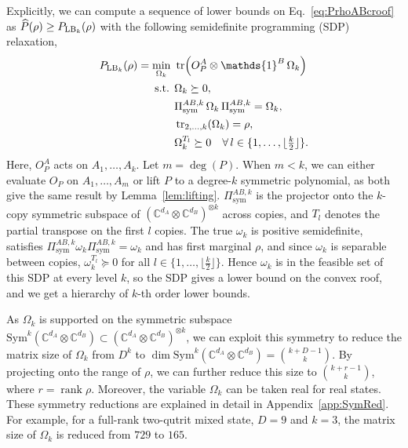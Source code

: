 \documentclass[11pt,a4paper]{report}
\newcommand{\one}{\mathds{1}}
\newcommand{\I}{\one}
\newcommand{\C}{\mathds{C}}
\newcounter{reptag}
\newif\iftags \tagsfalse   %
\newcommand{\reptagbox}[3]{\iftags\par\smallskip\noindent\refstepcounter{reptag}%
  \fcolorbox{#1}{#1!7}{\parbox{\dimexpr\linewidth-2\fboxsep-2\fboxrule\relax}{\small
  \textcolor{#1}{\textbf{[\thereptag]\ #2.}}\ #3}}\par\smallskip\fi}
\newcommand{\detail}[1]{\reptagbox{tagD}{More detail}{#1}}
\begin{document}
Explicitly, we can compute a sequence
of lower bounds on Eq.~\eqref{eq:PrhoABcroof} as $\widehat{P}(\rho)\geq P_{{\rm LB}_k}(\rho)$ with the following semidefinite programming (SDP) relaxation,
\begin{align}
    P_{{\rm LB}_k}(\rho)=\min_{\Omega_k} \ &\tr\!\left(O_P^A \otimes \I^B \, \Omega_k\right)\label{eq:SDPcroof1}\\
    \text{s.t. } & \Omega_k \succeq 0, \nonumber\\
    & \Pi_\text{sym}^{AB,k} \, \Omega_k\,\Pi_\text{sym}^{AB,k}  = \Omega_k,\nonumber\\
    & \tr_{2,\dots,k} (\Omega_k) = \rho, \nonumber\\
    & \Omega_k^{T_l} \succeq 0 \quad  \forall \, l \in \{1, \dots, \lfloor \tfrac{k}{2}\rfloor\}.\nonumber
\end{align}
Here, $O_P^A$ acts on $A_1,\dots,A_k$. Let $m = \deg(P)$. When $m<k$, we can either evaluate $O_P$ on $A_1,\dots,A_m$ or lift $P$ to a degree-$k$ symmetric polynomial, as both give the same result by Lemma~\ref{lem:lifting}. $\Pi_\text{sym}^{AB,k}$ is the projector onto the $k$-copy symmetric subspace of $(\C^{d_A}\otimes\C^{d_B})^{\otimes k}$ across copies, and $T_l$ denotes the partial transpose on the first $l$ copies.
The true $\omega_k$ is positive semidefinite, satisfies $\Pi_\text{sym}^{AB,k} \omega_k\Pi_\text{sym}^{AB,k} = \omega_k$ and has first marginal $\rho$, and since $\omega_k$ is separable between copies, $\omega_k^{T_l} \succeq 0$ for all $l \in \{1, \dots, \lfloor \tfrac{k}{2}\rfloor\}$. Hence $\omega_k$ is in the feasible set of this SDP at every level $k$, so the SDP gives a lower bound on the convex roof, and we get a hierarchy of $k$-th order lower bounds.
\detail{Check each constraint on the true $\omega_k$: positivity; Bose symmetry ($\ket{\psi_i}^{\otimes k}\in\mathrm{Sym}^k$); the marginal ($\tr_{2,\dots,k}\omega_k=\sum_ip_i\dyad{\psi_i}=\rho$); and PPT across copies (each term is a product across copies, so every partial transpose is again a mixture of positive operators). This shows that every $\omega_k$ is feasible, which is the whole reason the SDP gives a lower bound.}

As $\Omega_k$ is supported on the symmetric subspace $\text{Sym}^k(\C^{d_A}\otimes\C^{d_B})\subset(\C^{d_A}\otimes\C^{d_B})^{\otimes k}$, we can exploit this symmetry to reduce the matrix size of $\Omega_k$ from $D^{k}$ to $\dim \text{Sym}^k(\C^{d_A}\otimes\C^{d_B}) = \binom{k+D-1}{k}$. By projecting onto the range of $\rho$, we can further reduce this size to $\binom{k+r-1}{k}$, where $r=\operatorname{rank}\rho$. Moreover, the variable $\Omega_k$ can be taken real for real states. These symmetry reductions are explained in detail in Appendix~\ref{app:SymRed}.
For example, for a full-rank two-qutrit mixed state, $D=9$ and $k=3$, the matrix size of $\Omega_k$ is reduced from $729$ to $165$.
\end{document}
